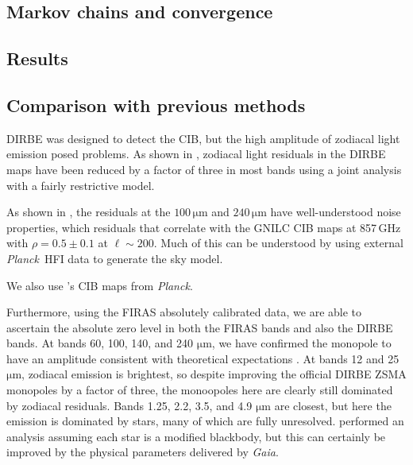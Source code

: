 \documentclass{aa}
\def\Planck{\textit{Planck}}
\begin{document}
\subsection{Markov chains and convergence}

\subsection{Results}

\subsection{Comparison with previous methods}

DIRBE was designed to detect the CIB, but the high amplitude of zodiacal light emission posed problems. As shown in \citet{CG02_02}, zodiacal light residuals in the DIRBE maps have been reduced by a factor of three in most bands using a joint analysis with a fairly restrictive model.

As shown in \citet{CG02_01}, the residuals at the $100\,\mathrm{\mu m}$ and $240\,\mathrm{\mu m}$ have well-understood noise properties, which residuals that correlate with the GNILC \citet{planck2016-XLVIII} CIB maps at 857\,GHz with $\rho=0.5\pm0.1$ at $\ell\sim200$. Much of this can be understood by using external \Planck\ HFI data to generate the sky model. 

We also use \citet{lenz2019}'s CIB maps from \Planck.

Furthermore, using the FIRAS absolutely calibrated data, we are able to ascertain the absolute zero level in both the FIRAS bands and also the DIRBE bands. At bands 60, 100, 140, and 240 $\mathrm{\mu m}$, we have confirmed the monopole to have an amplitude consistent with theoretical expectations \citep{finke2022}. At bands 12 and 25 $\mathrm{\mu m}$, zodiacal emission is brightest, so despite improving the official DIRBE ZSMA monopoles by a factor of three, the monoopoles here are clearly still dominated by zodiacal residuals. Bands 1.25, 2.2, 3.5, and 4.9 $\mathrm{\mu m}$ are closest, but here the emission is dominated by stars, many of which are fully unresolved. \citet{CG02_01} performed an analysis assuming each star is a modified blackbody, but this can certainly be improved by the physical parameters delivered by \textit{Gaia}.
\end{document}
